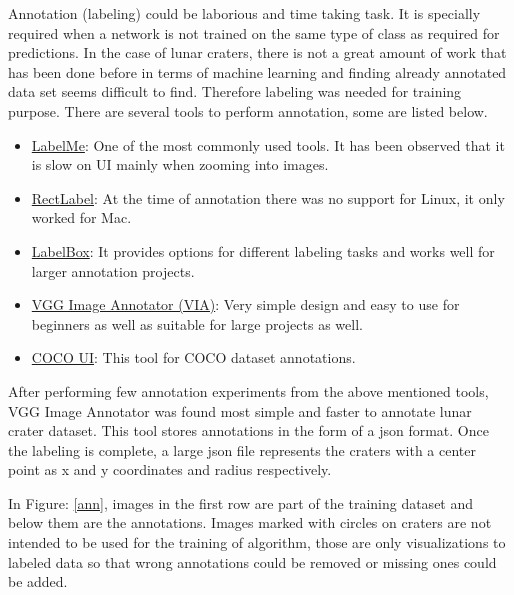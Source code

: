 \documentclass[11pt]{article}
\begin{document}
Annotation (labeling) could be laborious and time taking task. It is specially required when a network is not trained on the same type of class as required for predictions. In the case of lunar craters, there is not a great amount of work that has been done before in terms of machine learning and finding already annotated data set seems difficult to find. Therefore labeling was needed for training purpose. There are several tools to perform annotation, some are listed below.
\begin{itemize}
	\item \underline{LabelMe}: One of the most commonly used tools. It has been observed that it is slow on UI mainly when zooming into images.
	\item \underline{RectLabel}: At the time of annotation there was no support for Linux, it only worked for Mac.
	\item \underline{LabelBox}: It provides options for different labeling tasks and works well for larger annotation projects.
	\item \underline{VGG Image Annotator (VIA)}: Very simple design and easy to use for beginners as well as suitable for large projects as well.
	\item \underline{COCO UI}: This tool for COCO dataset annotations.
\end{itemize}

After performing few annotation experiments from the above mentioned tools, VGG Image Annotator was found most simple and faster to annotate lunar crater dataset. This tool stores annotations in the form of a json format. Once the labeling is complete, a large json file represents the craters with a center point as x and y coordinates and radius respectively.

In Figure: \ref{ann}, images in the first row are part of the training dataset and below them are the annotations. Images marked with circles on craters are not intended to be used for the training of algorithm, those are only visualizations to labeled data so that wrong annotations could be removed or missing ones could be added.
\end{document}
